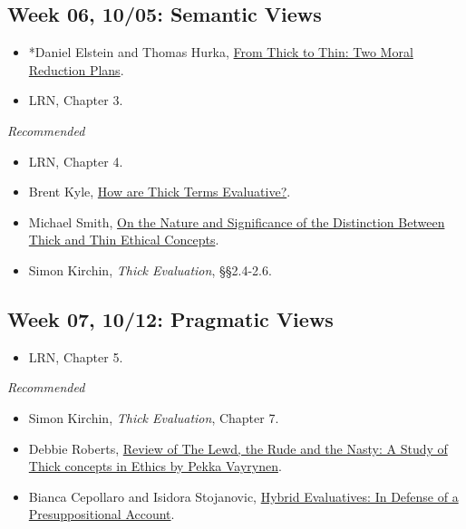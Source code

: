 \documentclass[
]{article}
\providecommand{\tightlist}{%
  \setlength{\itemsep}{0pt}\setlength{\parskip}{0pt}}
\begin{document}
\hypertarget{week-06-1005-semantic-views}{%
\subsection{Week 06, 10/05: Semantic
Views}\label{week-06-1005-semantic-views}}

\begin{itemize}
\tightlist
\item
  *Daniel Elstein and Thomas Hurka,
  \href{https://www.jstor.org/stable/27822063}{From Thick to Thin: Two
  Moral Reduction Plans}.
\item
  LRN, Chapter 3.
\end{itemize}

\emph{Recommended}

\begin{itemize}
\tightlist
\item
  LRN, Chapter 4.
\item
  Brent Kyle, \href{http://hdl.handle.net/2027/spo.3521354.0013.001}{How
  are Thick Terms Evaluative?}.
\item
  Michael Smith,
  \href{http://www.princeton.edu/~msmith/mypapers/Thick\%20and\%20Thin.pdf}{On
  the Nature and Significance of the Distinction Between Thick and Thin
  Ethical Concepts}.
\item
  Simon Kirchin, \emph{Thick Evaluation}, §§2.4-2.6.
\end{itemize}

\newpage

\hypertarget{week-07-1012-pragmatic-views}{%
\subsection{Week 07, 10/12: Pragmatic
Views}\label{week-07-1012-pragmatic-views}}

\begin{itemize}
\tightlist
\item
  LRN, Chapter 5.
\end{itemize}

\emph{Recommended}

\begin{itemize}
\tightlist
\item
  Simon Kirchin, \emph{Thick Evaluation}, Chapter 7.
\item
  Debbie Roberts,
  \href{https://www.journals.uchicago.edu/doi/10.1086/679534}{Review of
  The Lewd, the Rude and the Nasty: A Study of Thick concepts in Ethics
  by Pekka Vayrynen}.
\item
  Bianca Cepollaro and Isidora Stojanovic,
  \href{https://brill.com/view/journals/gps/93/3/article-p458_7.xml}{Hybrid
  Evaluatives: In Defense of a Presuppositional Account}.
\end{itemize}
\end{document}
